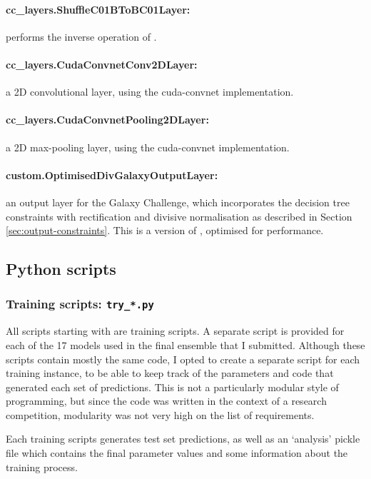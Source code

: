 \documentclass[a4paper,10pt]{article}
\begin{document}
\paragraph{cc\_layers.ShuffleC01BToBC01Layer:} performs the inverse operation of .

\paragraph{cc\_layers.CudaConvnetConv2DLayer:} a 2D convolutional layer, using the cuda-convnet implementation.

\paragraph{cc\_layers.CudaConvnetPooling2DLayer:} a 2D max-pooling layer, using the cuda-convnet implementation.

\paragraph{custom.OptimisedDivGalaxyOutputLayer:} an output layer for the Galaxy Challenge, which incorporates the decision tree constraints with rectification and divisive normalisation as described in Section \ref{sec:output-constraints}. This is a version of , optimised for performance.



\subsection{Python scripts}

\subsubsection{Training scripts: \texttt{try\_*.py}}

All scripts starting with  are training scripts. A separate script is provided for each of the 17 models used in the final ensemble that I submitted. Although these scripts contain mostly the same code, I opted to create a separate script for each training instance, to be able to keep track of the parameters and code that generated each set of predictions. This is not a particularly modular style of programming, but since the code was written in the context of a research competition, modularity was not very high on the list of requirements.

Each training scripts generates test set predictions, as well as an `analysis' pickle file which contains the final parameter values and some information about the training process.
\end{document}
